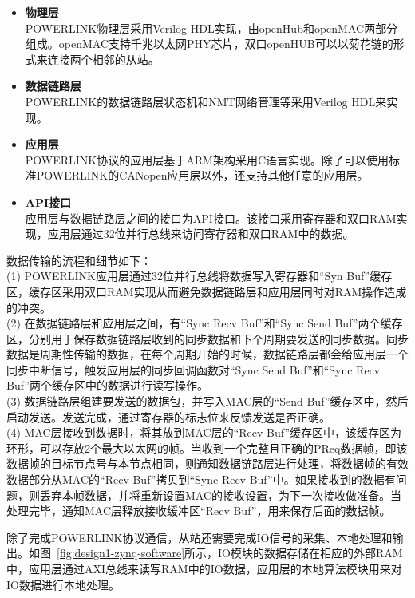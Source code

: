 \begin{itemize}

\item \textbf{物理层} \\ 
POWERLINK物理层采用Verilog HDL实现，由openHub和openMAC两部分组成。openMAC支持千兆以太网PHY芯片，双口openHUB可以以菊花链的形式来连接两个相邻的从站。 

\item \textbf{数据链路层} \\ 
POWERLINK的数据链路层状态机和NMT网络管理等采用Verilog HDL来实现。

\item \textbf{应用层} \\ 
POWERLINK协议的应用层基于ARM架构采用C语言实现。除了可以使用标准POWERLINK的CANopen应用层以外，还支持其他任意的应用层。

\item \textbf{API接口} \\ 
应用层与数据链路层之间的接口为API接口。该接口采用寄存器和双口RAM实现，应用层通过32位并行总线来访问寄存器和双口RAM中的数据。

\end{itemize}

数据传输的流程和细节如下：\\
(1) POWERLINK应用层通过32位并行总线将数据写入寄存器和“Syn Buf”缓存区，缓存区采用双口RAM实现从而避免数据链路层和应用层同时对RAM操作造成的冲突。\\
(2) 在数据链路层和应用层之间，有“Sync Recv Buf”和“Sync Send Buf”两个缓存区，分别用于保存数据链路层收到的同步数据和下个周期要发送的同步数据。同步数据是周期性传输的数据，在每个周期开始的时候，数据链路层都会给应用层一个同步中断信号，触发应用层的同步回调函数对“Sync Send Buf”和“Sync Recv Buf”两个缓存区中的数据进行读写操作。\\
(3) 数据链路层组建要发送的数据包，并写入MAC层的“Send Buf”缓存区中，然后启动发送。发送完成，通过寄存器的标志位来反馈发送是否正确。\\
(4) MAC层接收到数据时，将其放到MAC层的“Recv Buf”缓存区中，该缓存区为环形，可以存放2个最大以太网的帧。当收到一个完整且正确的PReq数据帧，即该数据帧的目标节点号与本节点相同，则通知数据链路层进行处理，将数据帧的有效数据部分从MAC的“Recv Buf”拷贝到“Sync Recv Buf”中。如果接收到的数据有问题，则丢弃本帧数据，并将重新设置MAC的接收设置，为下一次接收做准备。当处理完毕，通知MAC层释放接收缓冲区“Recv Buf”，用来保存后面的数据帧。

除了完成POWERLINK协议通信，从站还需要完成IO信号的采集、本地处理和输出。如图~\ref{fig:design1-zynq-software}所示，IO模块的数据存储在相应的外部RAM中，应用层通过AXI总线来读写RAM中的IO数据，应用层的本地算法模块用来对IO数据进行本地处理。

